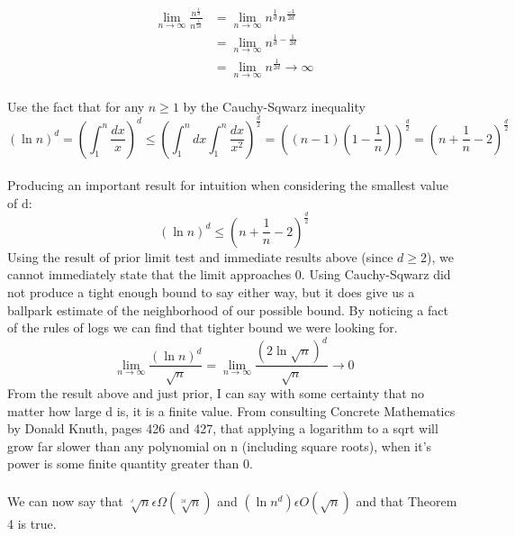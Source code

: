 \documentclass[12pt]{article}
\begin{document}
\begin{align}
\lim_{n\to\infty} \frac{n^{\frac{1}{d}}}{n^{\frac{1}{2d}}} &= \lim_{n\to\infty} n^{\frac{1}{d}} n^{\frac{-1}{2d}}\\
&= \lim_{n\to\infty} n^{\frac{1}{d}-\frac{1}{2d}}\\
&= \lim_{n\to\infty} n^{\frac{1}{2d}} \rightarrow \infty
\end{align}\\
Use the fact that for any \begin{math} n  \geq 1\end{math} by the Cauchy-Sqwarz inequality\
\[(\ln{n})^d = (\int_{1}^{n} \frac{dx}{x})^d \leq (\int_{1}^{n} dx \int_{1}^{n} \frac{dx}{x^2})^{\frac{d}{2}} = ((n-1)(1-\frac{1}{n}))^{\frac{d}{2}} = (n + \frac{1}{n} - 2)^{\frac{d}{2}}\]\\
Producing an important result for intuition when considering the smallest value of d:
\[(\ln{n})^d \leq (n + \frac{1}{n} - 2)^{\frac{d}{2}}\]
Using the result of prior limit test and immediate results above (since \begin{math}d \geq 2\end{math}), we cannot immediately state that the limit approaches 0. Using Cauchy-Sqwarz did not produce a tight enough bound to say either way, but it does give us a ballpark estimate of the neighborhood of our possible bound. By noticing a fact of the rules of logs we can find that tighter bound we were looking for.
\[\lim_{n\to\infty} \frac{(\ln{n})^d}{\sqrt{n}} =\lim_{n\to\infty} \frac{(2\ln{\sqrt{n}})^d}{\sqrt{n}} \rightarrow 0\]
From the result above and just prior, I can say with some certainty that no matter how large d is, it is a finite value. From consulting Concrete Mathematics by Donald Knuth, pages 426 and 427, that applying a logarithm to a sqrt will grow far slower than any polynomial on n (including square roots), when it's power is some finite quantity greater than 0.\\\\
We can now say that \begin{math}\sqrt[^d]{n} \epsilon \Omega (\sqrt[^{2d}]{n})\end{math} and \begin{math}(\ln {n}^d) \epsilon O(\sqrt{n})\end{math} and that Theorem 4 is true.
\end{document}

